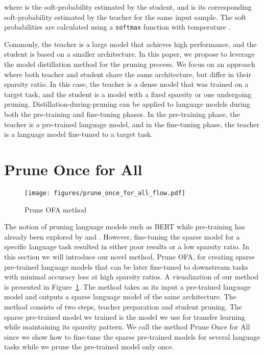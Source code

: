 \documentclass{article}
\begin{document}
where  is the soft-probability estimated by the student, and  is its corresponding soft-probability estimated by the teacher for the same input sample. The soft probabilities are calculated using a \texttt{softmax} function with temperature .

Commonly, the teacher is a large model that achieves high performance, and the student is based on a smaller architecture. 
In this paper, we propose to leverage the model distillation method for the pruning process. 
We focus on an approach where both teacher and student share the same architecture, but differ in their sparsity ratio. 
In this case, the teacher is a dense model that was trained on a target task, and the student is a model with a fixed sparsity or one undergoing pruning. 
Distillation-during-pruning can be applied to language models during both the pre-training and fine-tuning phases. 
In the pre-training phase, the teacher is a pre-trained language model, and in the fine-tuning phase, the teacher is a language model fine-tuned to a target task. 

\section{Prune Once for All}
\label{sec:sparse-pre-train-models}
\begin{figure}[t]
\centering
	\texttt{[image: figures/prune\_once\_for\_all\_flow.pdf]}
    \caption{Prune OFA method}
    \label{fig:prune-once-for-all}
\end{figure}
The notion of pruning language models such as BERT \citep{devlin2018bert} while pre-training has already been explored by \citet{chen2020lottery} and \citet{gordon2020pre-train}.
However, fine-tuning the sparse model for a specific language task resulted in either poor results or a low sparsity ratio.
In this section we will introduce our novel method, Prune OFA, for creating sparse pre-trained language models that can be later fine-tuned to downstream tasks with minimal accuracy loss at high sparsity ratios.
A visualization of our method is presented in Figure~\ref{fig:prune-once-for-all}.
The method takes as its input a pre-trained language model and outputs a sparse language model of the same architecture.
The method consists of two steps, teacher preparation and student pruning. The sparse pre-trained model we trained is the model we use for transfer learning while maintaining its sparsity pattern.
We call the method Prune Once for All since we show how to fine-tune the sparse pre-trained models for several language tasks while we prune the pre-trained model only once.
\end{document}
